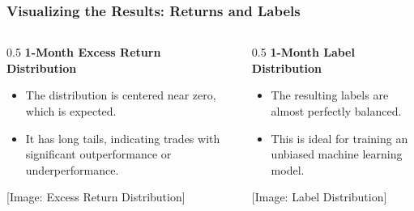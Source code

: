 \documentclass[aspectratio=169]{beamer}
\begin{document}
\begin{frame}
    \frametitle{Visualizing the Results: Returns and Labels}
    \begin{columns}
        \begin{column}{0.5\textwidth}
            \textbf{1-Month Excess Return Distribution}
            \begin{itemize}
                \item The distribution is centered near zero, which is expected.
                \item It has long tails, indicating trades with significant outperformance or underperformance.
            \end{itemize}

            [Image: Excess Return Distribution]
        \end{column}
        \begin{column}{0.5\textwidth}
            \textbf{1-Month Label Distribution}
            \begin{itemize}
                \item The resulting labels are almost perfectly balanced.
                \item This is ideal for training an unbiased machine learning model.
            \end{itemize}

            [Image: Label Distribution]
        \end{column}
    \end{columns}
\end{frame}
\end{document}
